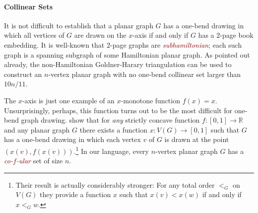 \documentclass{article}
\newcommand{\R}{\mathbb{R}}
\newcommand{\defin}[1]{\emph{\textcolor{Maroon}{#1}}}
\theoremstyle{definition}
\begin{document}
\paragraph{Collinear Sets}

It is not difficult to establish that a planar graph $G$ has a one-bend drawing in which all vertices of $G$ are drawn on the $x$-axis if and only if $G$ has a $2$-page book embedding. It is well-known that $2$-page graphs are \defin{subhamiltonian}; each such graph is a spanning subgraph of some Hamiltonian planar graph. As pointed out already, the non-Hamiltonian Goldner-Harary triangulation can be used to construct an $n$-vertex planar graph with no one-bend collinear set larger than $10n/11$.

The $x$-axis is just one example of an $x$-monotone function $f(x)=x$. Unsurprisingly, perhaps, this function turns out to be the most difficult for one-bend graph drawing.
\citet{DBLP:journals/comgeo/GiacomoDLW05} show that for \emph{any} strictly concave function $f:[0,1]\to\R$ and any planar graph $G$ there exists a function $x:V(G)\to[0,1]$ such that $G$
has a one-bend drawing in which each vertex $v$ of $G$ is drawn at the point $(x(v),f(x(v)))$.\footnote{Their result is actually considerably stronger: For any total order $<_G$ on $V(G)$ they provide a function $x$ such that $x(v) < x(w)$ if and only if $x<_G w$.}
  In our language, every $n$-vertex planar graph $G$ has a \defin{co-$f$-ular} set of size $n$.

\end{document}
